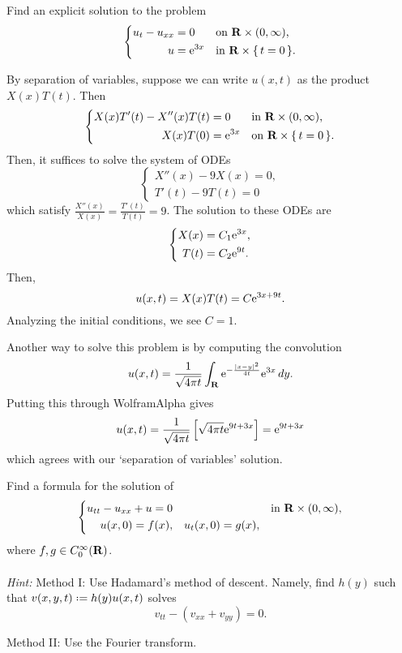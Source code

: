 \begin{problem}
  Find an explicit solution to the problem
  \[
    \left\{
      \begin{aligned}
        u_t-u_{xx}&=0&&\text{on \(\mathbf{R}\times(0,\infty)\),}\\
        u&=\mathrm{e}^{3x}&&\text{in \(\mathbf{R}\times\{\,t=0\,\}\).}
      \end{aligned}
    \right.
  \]
\end{problem}
\begin{solution*}
  By separation of variables, suppose we can write \(u(x,t)\) as the
  product \(X(x)T(t)\). Then
  \[
    \left\{
      \begin{aligned}
        X(x)T'(t)-X''(x)T(t)&=0&&\text{in \(\mathbf{R}\times(0,\infty)\),}\\
        X(x)T(0)&=\mathrm{e}^{3x}&&\text{on \(\mathbf{R}\times\{\,t=0\,\}\).}
      \end{aligned}
    \right.
  \]
  Then, it suffices to solve the system of ODEs
  \[
    \left\{
      \begin{aligned}
        X''(x)-9X(x)=0,\\
        T'(t)-9T(t)=0
      \end{aligned}
    \right.
  \]
  which satisfy \(\frac{X''(x)}{X(x)}=\frac{T'(t)}{T(t)}=9\). The solution
  to these ODEs are
  \[
    \left\{%
      \begin{aligned}
        X(x)&=C_1\rme^{3x},\\
        T(t)&=C_2\rme^{9t}.
      \end{aligned}
    \right.
  \]
  Then,
  \[
    u(x,t)=X(x)T(t)=C\mathrm{e}^{3x+9t}.
  \]
  Analyzing the initial conditions, we see \(C=1\).

  Another way to solve this problem is by computing the convolution
  \[
    u(x,t)=%
    \frac{1}{\sqrt{4\pi t}}
    \int_\R \rme^{-\frac{|x-y|^2}{4t}}
    \rme^{3x}\diff y.
  \]
  Putting this through \textsf{WolframAlpha} gives
  \[
    u(x,t)=%
    \frac{1}{\sqrt{4\pi t}}%
    \left[%
      \sqrt{4\pi t}\rme^{9t+3x}%
    \right]=%
    \rme^{9t+3x}
  \]
  which agrees with our `separation of variables' solution.
\end{solution*}

\begin{problem}
  Find a formula for the solution of
  \[
    \left\{
      \begin{aligned}
        u_{tt}-u_{xx}+u=0&&&&\text{in \(\mathbf{R}\times(0,\infty)\),}\\
        u(x,0)=f(x),&&u_t(x,0)=g(x),
      \end{aligned}
    \right.
  \]
  where \(f,g\in C_0^\infty(\mathbf{R})\).
  \\\\
  \emph{Hint:} Method I: Use Hadamard's method of
  descent. Namely, find \(h(y)\) such that \(v(x,y,t)\defeq h(y)u(x,t)\)
  solves
  \[
    v_{tt}-(v_{xx}+v_{yy})=0.
  \]

  \noindent Method II: Use the Fourier transform.
\end{problem}
\begin{solution*}
\end{solution*}

